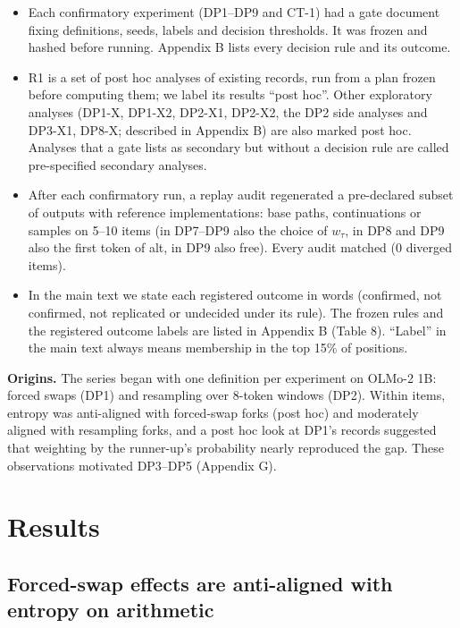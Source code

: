 \documentclass[
  10pt,
  a4paper,
]{article}
\providecommand{\tightlist}{%
  \setlength{\itemsep}{0pt}\setlength{\parskip}{0pt}}
\begin{document}
\begin{itemize}
\tightlist
\item
  Each confirmatory experiment (DP1--DP9 and CT-1) had a gate document fixing definitions, seeds, labels and decision thresholds. It was frozen and hashed before running. Appendix B lists every
  decision rule and its outcome.
\item
  R1 is a set of post hoc analyses of existing records, run from a plan frozen before computing them; we label its results ``post hoc''. Other exploratory analyses (DP1-X, DP1-X2, DP2-X1, DP2-X2, the
  DP2 side analyses and DP3-X1, DP8-X; described in Appendix B) are also marked post hoc. Analyses that a gate lists as secondary but without a decision rule are called pre-specified secondary
  analyses.
\item
  After each confirmatory run, a replay audit regenerated a pre-declared subset of outputs with reference implementations: base paths, continuations or samples on 5--10 items (in DP7--DP9 also the
  choice of \(w_{\tau}\), in DP8 and DP9 also the first token of alt, in DP9 also free). Every audit matched (0 diverged items).
\item
  In the main text we state each registered outcome in words (confirmed, not confirmed, not replicated or undecided under its rule). The frozen rules and the registered outcome labels are listed in
  Appendix B (Table 8). ``Label'' in the main text always means membership in the top 15\% of positions.
\end{itemize}

\textbf{Origins.} The series began with one definition per experiment on OLMo-2 1B: forced swaps (DP1) and resampling over 8-token windows (DP2). Within items, entropy was anti-aligned with
forced-swap forks (post hoc) and moderately aligned with resampling forks, and a post hoc look at DP1's records suggested that weighting by the runner-up's probability nearly reproduced the gap. These
observations motivated DP3--DP5 (Appendix G).

\hypertarget{results}{%
\section{Results}\label{results}}

\hypertarget{forced-swap-effects-are-anti-aligned-with-entropy-on-arithmetic}{%
\subsection{Forced-swap effects are anti-aligned with entropy on arithmetic}\label{forced-swap-effects-are-anti-aligned-with-entropy-on-arithmetic}}
\end{document}

